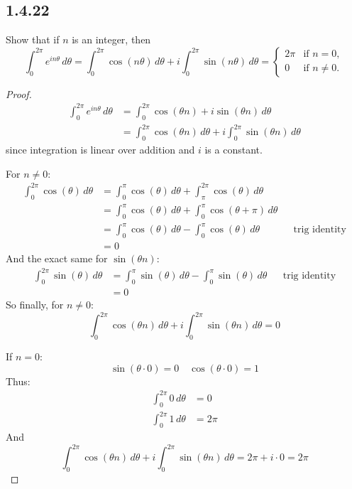 \documentclass{article}
\begin{document}
\subsection*{1.4.22}
Show that if $n$ is an integer, then
\[
  \int_0^{2\pi} e^{in\theta}\,d\theta
  = \int_0^{2\pi} \cos(n\theta)\,d\theta + i\int_0^{2\pi} \sin(n\theta)\,d\theta
  =
  \begin{cases}
    2\pi & \text{if } n = 0, \\
    0    & \text{if } n \neq 0.
  \end{cases}
\]
\begin{proof}
  \begin{align*}
    \int_0^{2\pi} e^{in\theta} \, d\theta
    &= \int_0^{2\pi} \cos(\theta n)
    + i\sin(\theta n)\, d\theta
    \\ &= \int_0^{2\pi} \cos(\theta n) \, d\theta
    + i \int_0^{2\pi} \sin(\theta n) \, d\theta
  \end{align*}
  since integration is linear over addition and $i$ is a constant.

  For $n\neq0$:
  \begin{align*}
    \int_0^{2\pi} \cos(\theta) \, d\theta
    &= \int_0^{\pi} \cos(\theta) \, d\theta
    + \int_{\pi}^{2 \pi} \cos(\theta) \, d\theta
    \\ &= \int_0^{\pi} \cos(\theta) \, d\theta
    + \int_0^{\pi} \cos(\theta + \pi) \, d\theta
    \\ &= \int_0^{\pi} \cos(\theta) \, d\theta
    - \int_0^{\pi} \cos(\theta) \, d\theta
    && \text{trig identity}
    \\ &= 0
  \end{align*}
  And the exact same for $\sin(\theta n)$:
  \begin{align*}
    \int_0^{2\pi} \sin(\theta) \, d\theta
    &= \int_0^{\pi} \sin(\theta) \, d\theta
    - \int_0^{\pi} \sin(\theta) \, d\theta
    && \text{trig identity}
    \\ &= 0
  \end{align*}
  So finally, for $n \neq 0$:
  \[
    \int_0^{2\pi} \cos(\theta n) \, d\theta
    + i \int_0^{2\pi} \sin(\theta n) \, d\theta
    = 0
  \]

  If $n = 0$:
  \[
    \sin(\theta \cdot 0) = 0 \quad \cos(\theta \cdot 0) = 1
  \]
  Thus:
  \begin{align*}
    \int_0^{2\pi}0 \, d\theta &= 0
    \\
    \int_0^{2\pi}1 \, d\theta &= 2\pi
  \end{align*}
  And
  \[
    \int_0^{2\pi} \cos(\theta n) \, d\theta
    + i \int_0^{2\pi} \sin(\theta n) \, d\theta
    = 2\pi + i \cdot 0
    = 2\pi
  \]
\end{proof}
\end{document}

